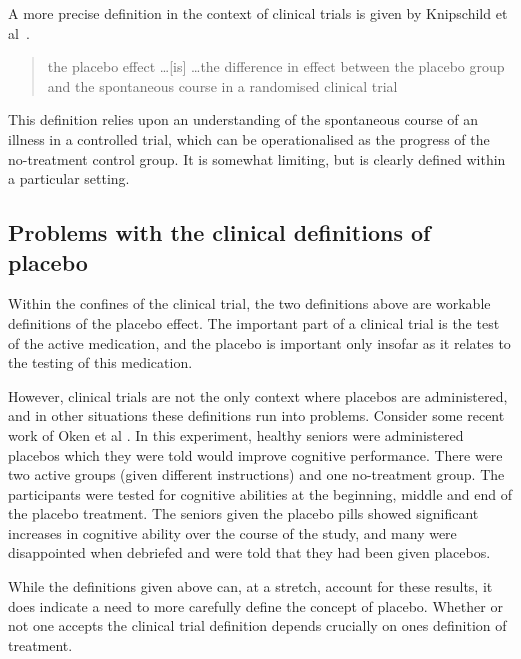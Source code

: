 A more precise definition in the context of clinical trials is given by Knipschild et al~\cite{Knipschild2005}. 

\begin{quote}
   the placebo effect \ldots [is] \ldots the difference in effect between the placebo group and the spontaneous course in a randomised clinical trial 
\end{quote}



This definition relies upon an understanding of the spontaneous course of an illness in a controlled trial, which can be operationalised as the progress of the no-treatment control group. It is somewhat limiting, but is clearly defined within a particular setting. %

\subsection{Problems with the clinical definitions of placebo}
\label{sec:plac-cogn-perf}

Within the confines of the clinical trial, the two definitions above are workable definitions of the placebo effect. The important part of a clinical trial is the test of the active medication, and the placebo is important only insofar as it relates to the testing of this medication. 

However, clinical trials are not the only context where placebos are administered, and in other situations these definitions run into problems. Consider some recent work of Oken et al \cite{Oken2008}. In this experiment, healthy seniors were administered placebos which they were told would improve cognitive performance. There were two active groups (given different instructions) and one no-treatment group. The participants were tested for cognitive abilities at the beginning, middle and end of the placebo treatment.  The seniors given the placebo pills showed significant increases in cognitive ability over the course of the study, and many were disappointed when debriefed and were told that they had been given placebos.

While the definitions given above can, at a stretch, account for these results, it does indicate a need to more carefully define the concept of placebo. Whether or not one accepts the clinical trial definition depends crucially on ones definition of treatment. 

